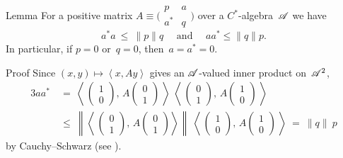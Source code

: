 \documentclass[a]{subfiles}
\begin{document}
\begin{parsec}
\begin{point}{Lemma}
For a positive
matrix $A\equiv \bigl(\begin{smallmatrix} p & a \\ a^* & q
\end{smallmatrix}\bigr)$
over a $C^*$-algebra~$\mathscr{A}$
we have
\begin{equation*}
	a^*a\ \leq\  \|p\|q
	\quad\text{ and }\quad
	aa^*\leq \|q\|p.
\end{equation*}
In particular,
if $p=0$ or~$q=0$, then~$a=a^*=0$.
\begin{point}{Proof}%
Since $(x,y)\mapsto \left<x,Ay\right>$
gives an $\mathscr{A}$-valued inner product
on~$\mathscr{A}^2$,
{
\newcommand\twovect[2]{%
\left(\begin{smallmatrix}#1\\#2\end{smallmatrix}\right)}
\newcommand\onezero{\twovect{1}{0}}
\newcommand\zeroone{\twovect{0}{1}}
\begin{alignat*}{3}
	aa^*
	\ &=\  \left<\,\onezero,\,A\zeroone\,\right> \ 
\left<\,\zeroone,\,A\onezero\,\right> \\
\ &\leq\  
\left\|\left<\,\zeroone,\,A\zeroone\right>\right\| \ 
\left<\,\onezero,\,A\onezero\,\right>
\ =\  \|q\|\  p
\end{alignat*}
}
by Cauchy--Schwarz (see ).


\end{point}
\end{point}
\end{parsec}
\end{document}
